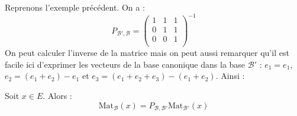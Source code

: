 \documentclass[a4paper,10pt]{report}
\begin{document}
\begin{Exemple} Reprenons l'exemple précédent. On a :
$$ P_{\mathcal{B}', \mathcal{B}} = \begin{pmatrix}
1 & 1 & 1 \\
0 & 1 & 1 \\
0 & 0& 1 \\
\end{pmatrix}^{-1}$$
On peut calculer l'inverse de la matrice mais on peut aussi remarquer qu'il est facile ici d'exprimer les vecteurs de la base canonique dans la base $\mathcal{B}'$ : $e_1=e_1$, $e_2 =(e_1+e_2)-e_1$ et $e_3 = (e_1+e_2+e_3)-(e_1+e_2)$. Ainsi :

\vspace{3cm}
\end{Exemple}

\begin{Proposition}{} Soit $x \in E$. Alors :
$$ \textrm{Mat}_{\mathcal{B}}(x) = P_{\mathcal{B}, \mathcal{B}'} \textrm{Mat}_{\mathcal{B}'}(x)$$
\end{Proposition}

\end{document}

